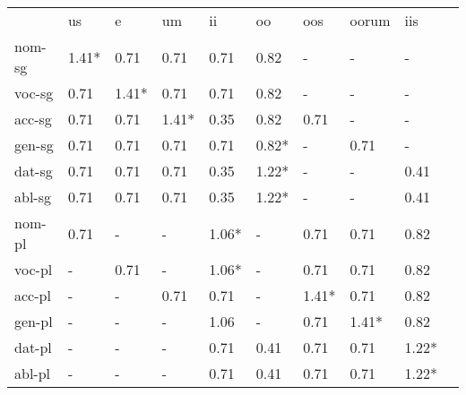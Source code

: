 \documentclass{article}
\begin{document}
\begin{tabular}{llllllllll}\toprule
                  &us      &e       &um      &ii      &oo      &oos     &oorum   &iis     \\ 
nom-sg         & 1.41*  &  0.71  &  0.71  &  0.71  &  0.82  &    -   &    -   &    -   \\ 
voc-sg         &  0.71  & 1.41*  &  0.71  &  0.71  &  0.82  &    -   &    -   &    -   \\ 
acc-sg         &  0.71  &  0.71  & 1.41*  &  0.35  &  0.82  &  0.71  &    -   &    -   \\ 
gen-sg         &  0.71  &  0.71  &  0.71  &  0.71  & 0.82*  &    -   &  0.71  &    -   \\ 
dat-sg         &  0.71  &  0.71  &  0.71  &  0.35  & 1.22*  &    -   &    -   &  0.41  \\ 
abl-sg         &  0.71  &  0.71  &  0.71  &  0.35  & 1.22*  &    -   &    -   &  0.41  \\ 
nom-pl         &  0.71  &    -   &    -   & 1.06*  &    -   &  0.71  &  0.71  &  0.82  \\ 
voc-pl         &    -   &  0.71  &    -   & 1.06*  &    -   &  0.71  &  0.71  &  0.82  \\ 
acc-pl         &    -   &    -   &  0.71  &  0.71  &    -   & 1.41*  &  0.71  &  0.82  \\ 
gen-pl         &    -   &    -   &    -   &  1.06  &    -   &  0.71  & 1.41*  &  0.82  \\ 
dat-pl         &    -   &    -   &    -   &  0.71  &  0.41  &  0.71  &  0.71  & 1.22*  \\ 
abl-pl         &    -   &    -   &    -   &  0.71  &  0.41  &  0.71  &  0.71  & 1.22*  \\ 
\end{tabular}

 \vspace{0.2in}
\end{document}
